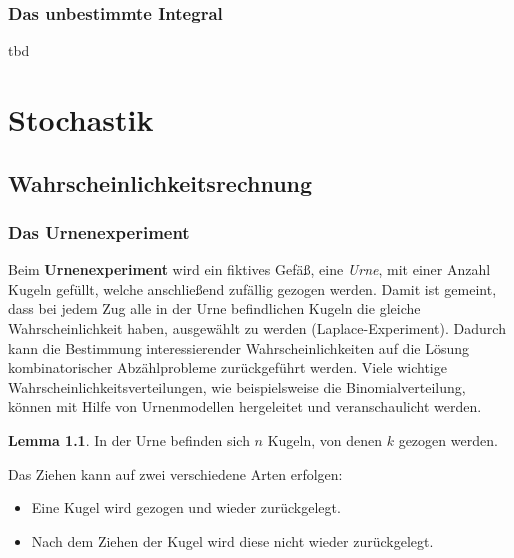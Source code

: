\documentclass[a4paper,10pt,DIV9, BCOR12mm, oneside,openright,openbib]{scrreprt}
\theoremstyle{definition}
\newtheorem{lemma}{Lemma}[section]
\theoremstyle{plain}
\begin{document}
\subsection{Das unbestimmte Integral}
tbd

\chapter{Stochastik}
\section{Wahrscheinlichkeitsrechnung}
\subsection{Das Urnenexperiment}
Beim \textbf{Urnenexperiment} wird ein fiktives Gefäß, eine \textit{Urne}, mit einer Anzahl Kugeln gefüllt, welche anschließend zufällig gezogen werden. Damit ist gemeint, dass bei jedem Zug alle in der Urne befindlichen Kugeln die gleiche Wahrscheinlichkeit haben, ausgewählt zu werden (Laplace-Experiment). Dadurch kann die Bestimmung interessierender Wahrscheinlichkeiten auf die Lösung kombinatorischer Abzählprobleme zurückgeführt werden. Viele wichtige Wahrscheinlichkeitsverteilungen, wie beispielsweise die Binomialverteilung, können mit Hilfe von Urnenmodellen hergeleitet und veranschaulicht werden.
\begin{lemma}
 In der Urne befinden sich $n$ Kugeln, von denen $k$ gezogen werden.
\end{lemma}
Das Ziehen kann auf zwei verschiedene Arten erfolgen:
\begin{itemize}
 \item Eine Kugel wird gezogen und wieder zurückgelegt.
 \item Nach dem Ziehen der Kugel wird diese nicht wieder zurückgelegt.
\end{itemize}
\end{document}
